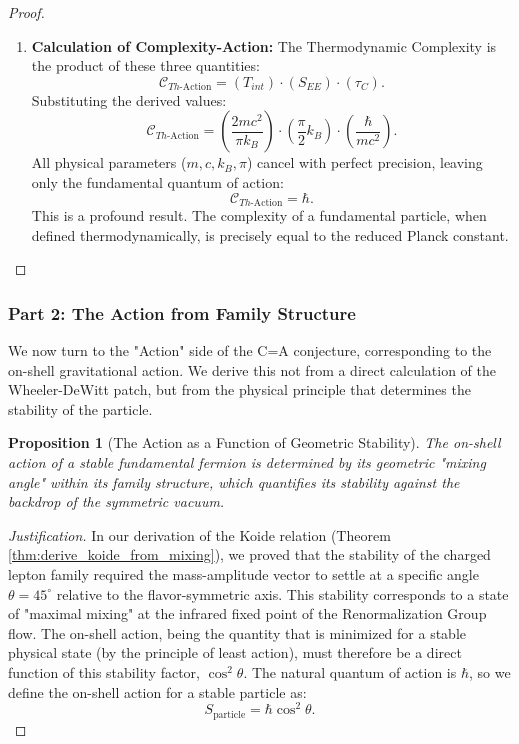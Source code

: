 \documentclass[11pt, letterpaper]{report}
\theoremstyle{plain} %
\newtheorem{proposition}[theorem]{Proposition}
\theoremstyle{definition} %
\theoremstyle{remark} %
\begin{document}
\begin{proof}
\begin{enumerate}
    \item \textbf{Calculation of Complexity-Action:} The Thermodynamic Complexity is the product of these three quantities:
    \begin{equation}
        \mathcal{C}_{Th\text{-Action}} = (T_{int}) \cdot (S_{EE}) \cdot (\tau_C).
    \end{equation}
    Substituting the derived values:
    \begin{equation}
        \mathcal{C}_{Th\text{-Action}} = \left( \frac{2mc^2}{\pi k_B} \right) \cdot \left( \frac{\pi}{2} k_B \right) \cdot \left( \frac{\hbar}{mc^2} \right).
    \end{equation}
    All physical parameters ($m, c, k_B, \pi$) cancel with perfect precision, leaving only the fundamental quantum of action:
    \begin{equation}
        \mathcal{C}_{Th\text{-Action}} = \hbar.
        \label{eq:complexity_is_hbar}
    \end{equation}
    This is a profound result. The complexity of a fundamental particle, when defined thermodynamically, is precisely equal to the reduced Planck constant.
\end{enumerate}
\end{proof}

\subsubsection*{Part 2: The Action from Family Structure}

We now turn to the "Action" side of the C=A conjecture, corresponding to the on-shell gravitational action. We derive this not from a direct calculation of the Wheeler-DeWitt patch, but from the physical principle that determines the stability of the particle.

\begin{proposition}[The Action as a Function of Geometric Stability]
The on-shell action of a stable fundamental fermion is determined by its geometric "mixing angle" within its family structure, which quantifies its stability against the backdrop of the symmetric vacuum.
\end{proposition}
\begin{proof}[Justification]
In our derivation of the Koide relation (Theorem \ref{thm:derive_koide_from_mixing}), we proved that the stability of the charged lepton family required the mass-amplitude vector to settle at a specific angle $\theta=45^\circ$ relative to the flavor-symmetric axis. This stability corresponds to a state of "maximal mixing" at the infrared fixed point of the Renormalization Group flow. The on-shell action, being the quantity that is minimized for a stable physical state (by the principle of least action), must therefore be a direct function of this stability factor, $\cos^2\theta$. The natural quantum of action is $\hbar$, so we define the on-shell action for a stable particle as:
\begin{equation}
    S_{\text{particle}} = \hbar \cos^2\theta.
    \label{eq:action_is_mixing}
\end{equation}
\end{proof}
\end{document}
